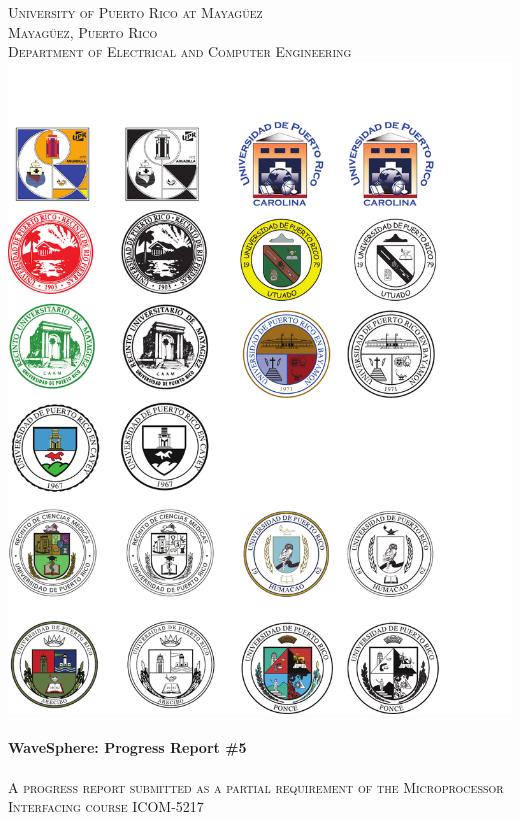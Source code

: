 \begin{titlepage}

\begin{center}


    

\textsc{\large University of Puerto Rico at Mayag\"{u}ez}\\[0.5cm]
\textsc{\large Mayag\"{u}ez, Puerto Rico}\\[0.5cm]
\textsc{\normalsize Department of Electrical and Computer Engineering}\\[1.5cm]
\includegraphics[scale=1.25]{res/logo_rum}\\[1cm]


\HRule \\[0.5cm]
{ \huge \bfseries WaveSphere: Progress Report \#5}\\[0.2cm]
\HRule \\[0.5cm]
\textsc{A progress report submitted as a partial requirement of the Microprocessor Interfacing course ICOM-5217}\\[0.5cm]


\end{center}
\end{titlepage}
